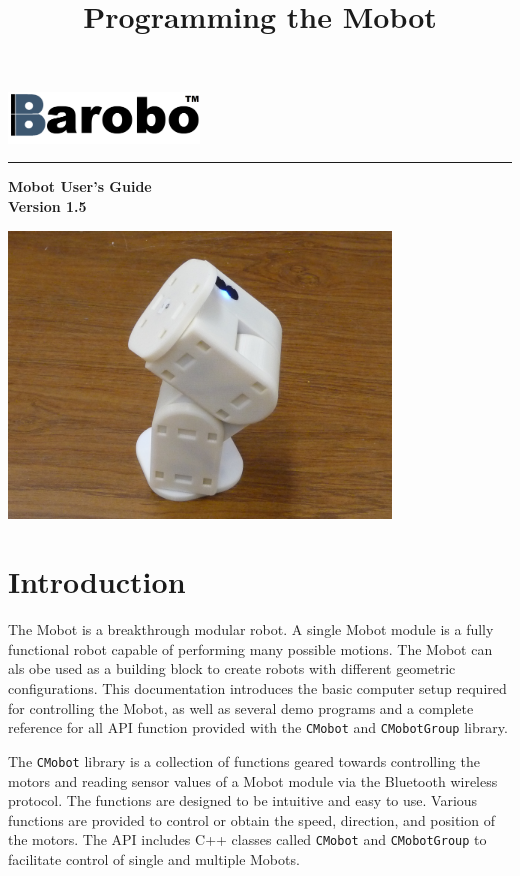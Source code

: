 \documentclass{article}
\title{Programming the Mobot}
\begin{document}
\includegraphics[width=2in]{images/Barobo.png}
\hrule
\begin{center}
\vspace*{2.5cm}
{\Huge\sf\bf Mobot User's Guide}\\
\vspace*{2.5cm}
{\Large\bf Version 1.5}
\vspace{4.5cm}

\includegraphics[width=4in]{images/Mobot_Camera_Stand.JPG}
\end{center}


\newpage
\tableofcontents
\newpage
\section{Introduction}
The Mobot is a breakthrough modular robot. A single Mobot module is a fully 
functional robot capable of performing many possible motions. The Mobot
can als obe used as a building block to create robots with different
geometric configurations. 
This documentation introduces the basic computer setup required for controlling 
the Mobot, as well as several demo programs and a complete reference for all
API function provided with the \texttt{CMobot} and \texttt{CMobotGroup} library.

The \texttt{CMobot} library is a collection of functions geared towards
controlling the motors and reading sensor values of a Mobot module via the
Bluetooth wireless protocol. The functions are designed to be intuitive
and easy to use. Various functions are provided to control or obtain the speed,
direction, and position of the motors. The API includes C++ classes called
\texttt{CMobot} and \texttt{CMobotGroup} to facilitate control of 
single and multiple Mobots.
\end{document}
